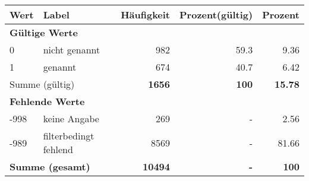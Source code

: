      \begin{longtable}{lXrrr}
     \toprule
     \textbf{Wert} & \textbf{Label} & \textbf{Häufigkeit} & \textbf{Prozent(gültig)} & \textbf{Prozent} \\
     \endhead
     \midrule
     \multicolumn{5}{l}{\textbf{Gültige Werte}}\\

     0 &
     \multicolumn{1}{X}{ nicht genannt   } &


       \num{982} &
       \num[round-mode=places,round-precision=2]{59,3} &
         \num[round-mode=places,round-precision=2]{9,36} \\

     1 &
     \multicolumn{1}{X}{ genannt   } &


       \num{674} &
       \num[round-mode=places,round-precision=2]{40,7} &
         \num[round-mode=places,round-precision=2]{6,42} \\
     \midrule
     \multicolumn{2}{l}{Summe (gültig)} &
       \textbf{\num{1656}} &
     \textbf{100} &
       \textbf{\num[round-mode=places,round-precision=2]{15,78}} \\
     \multicolumn{5}{l}{\textbf{Fehlende Werte}}\\
       -998 &
       keine Angabe &
         \num{269} &
        - &
         \num[round-mode=places,round-precision=2]{2,56} \\
       -989 &
       filterbedingt fehlend &
         \num{8569} &
        - &
         \num[round-mode=places,round-precision=2]{81,66} \\
     \midrule
     \multicolumn{2}{l}{\textbf{Summe (gesamt)}} &
          \textbf{\num{10494}} &
        \textbf{-} &
        \textbf{100} \\
     \bottomrule
     \end{longtable}
     
